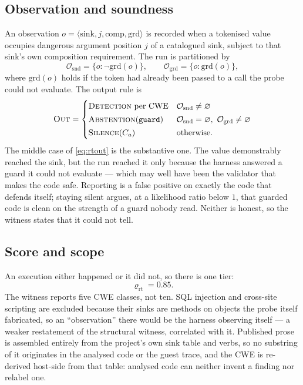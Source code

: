\documentclass[conference]{IEEEtran}
\begin{document}
\subsection{Observation and soundness}
An observation $o=\langle \mathrm{sink}, j, \mathrm{comp}, \mathrm{grd}\rangle$ is recorded
when a tokenised value occupies dangerous argument position $j$ of a catalogued sink, subject
to that sink's own composition requirement. The run is partitioned by
\begin{equation}
\mathcal{O}_{\mathrm{snd}} = \{o : \neg\mathrm{grd}(o)\}, \qquad
\mathcal{O}_{\mathrm{grd}} = \{o : \mathrm{grd}(o)\},
\end{equation}
where $\mathrm{grd}(o)$ holds if the token had already been passed to a call the probe could
not evaluate. The output rule is
\begin{equation}
\textsc{Out} =
\begin{cases}
\text{\textsc{Detection} per CWE} & \mathcal{O}_{\mathrm{snd}} \neq \varnothing\\[2pt]
\textsc{Abstention}(\texttt{guard}) & \mathcal{O}_{\mathrm{snd}}=\varnothing,\ \mathcal{O}_{\mathrm{grd}} \neq \varnothing\\[2pt]
\textsc{Silence}(C_a) & \text{otherwise.}
\end{cases}
\label{eq:rtout}
\end{equation}
The middle case of \eqref{eq:rtout} is the substantive one. The value demonstrably reached
the sink, but the run reached it only because the harness answered a guard it could not
evaluate --- which may well have been the validator that makes the code safe. Reporting is a
false positive on exactly the code that defends itself; staying silent argues, at a
likelihood ratio below $1$, that guarded code is clean on the strength of a guard nobody
read. Neither is honest, so the witness states that it could not tell.

\subsection{Score and scope}
An execution either happened or it did not, so there is one tier:
\begin{equation}
\varrho_{\mathrm{rt}} = 0.85 .
\end{equation}
The witness reports five CWE classes, not ten. SQL injection and cross-site scripting are
excluded because their sinks are methods on objects the probe itself fabricated, so an
``observation'' there would be the harness observing itself --- a weaker restatement of the
structural witness, correlated with it. Published prose is assembled entirely from the
project's own sink table and verbs, so no substring of it originates in the analysed code or
the guest trace, and the CWE is re-derived host-side from that table: analysed code can
neither invent a finding nor relabel one.
\end{document}
